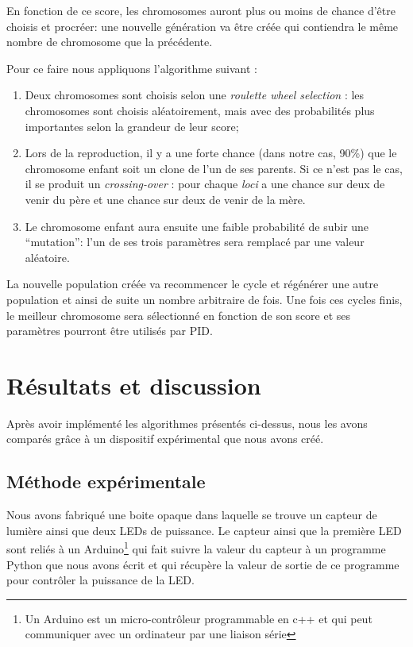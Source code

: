 \documentclass[a4paper,10pt]{report}
\begin{document}
En fonction de ce score, les chromosomes auront plus ou moins de chance d'être choisis et procréer: une nouvelle génération va être créée qui contiendra le même nombre de chromosome que la précédente.

Pour ce faire nous appliquons l'algorithme suivant :
\begin{enumerate}
  \item Deux chromosomes sont choisis selon une \textit{roulette wheel selection} : les chromosomes sont choisis aléatoirement, mais avec des probabilités plus importantes selon la grandeur de leur score;
  \item Lors de la reproduction, il y a une forte chance (dans notre cas, 90\%) que le chromosome enfant soit un clone de l'un de ses parents. Si ce n'est pas le cas, il se produit un \textit{crossing-over} : pour chaque \textit{loci} a une chance sur deux de venir du père et une chance sur deux de venir de la mère.
  \item Le chromosome enfant aura ensuite une faible probabilité de subir une ``mutation'': l'un de ses trois paramètres sera remplacé par une valeur aléatoire.
\end{enumerate}

La nouvelle population créée va recommencer le cycle et régénérer une autre population et ainsi de suite un nombre arbitraire de fois.
Une fois ces cycles finis, le meilleur chromosome sera sélectionné en fonction de son score et ses paramètres pourront être utilisés par PID.


\chapter{Résultats et discussion}
\label{chap:res}

Après avoir implémenté les algorithmes présentés ci-dessus, nous les avons comparés grâce à un dispositif expérimental que nous avons créé.

\section{Méthode expérimentale}
\label{sec:methode}
Nous avons fabriqué une boite opaque dans laquelle se trouve un capteur de lumière ainsi que deux LEDs de puissance. Le capteur ainsi que la première LED sont reliés à un Arduino\footnote{Un Arduino est un micro-contrôleur programmable en c++ et qui peut communiquer avec un ordinateur par une liaison série} qui fait suivre la valeur du capteur à un programme Python que nous avons écrit et qui récupère la valeur de sortie de ce programme pour contrôler la puissance de la LED.
\end{document}
